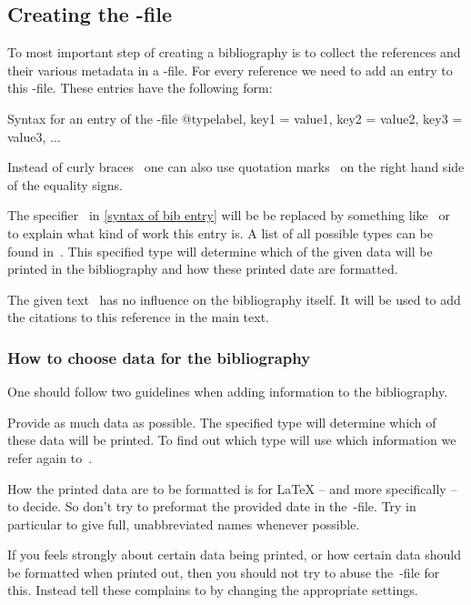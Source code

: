 \subsection{Creating the -file}

To most important step of creating a bibliography is to collect the references and their various metadata in a -file.
For every reference we need to add an entry to this -file.
These entries have the following form:
\begin{showcode}[label = {syntax of bib entry}]{Syntax for an entry of the -file}
@type{label,
  key1 = {value1},
  key2 = {value2},
  key3 = {value3},
  ...
}
\end{showcode}
Instead of curly braces~\inlinecode{\{ \}} one can also use quotation marks~ on the right hand side of the equality signs.

The specifier~ in \cref{syntax of bib entry} will be be replaced by something like~ or~ to explain what kind of work this entry is.
A list of all possible types can be found in~\cite[2.1]{biblatex}.
This specified type will determine which of the given data will be printed in the bibliography and how these printed date are formatted.

The given text~ has no influence on the bibliography itself.
It will be used to add the citations to this reference in the main text.

\subsubsection{How to choose data for the bibliography}

One should follow two guidelines when adding information to the bibliography.
\begin{myitemize}
  \item
    Provide as much data as possible.
    The specified type will determine which of these data will be printed.
    To find out which type will use which information we refer again to~\cite[2.1, 2.2]{biblatex}.
  \item
    How the printed data are to be formatted is for {\LaTeX} -- and more specifically  -- to decide.
    So don’t try to preformat the provided date in the~-file.
    Try in particular to give full, unabbreviated names whenever possible.
\end{myitemize}
If you feels strongly about certain data being printed, or how certain data should be formatted when printed out, then you should not try to abuse the~-file for this.
Instead tell these complains to  by changing the appropriate settings.

